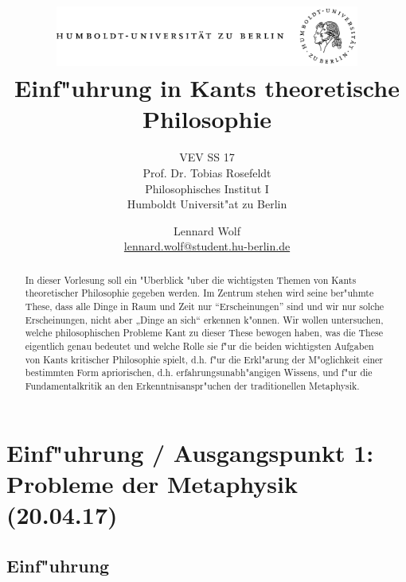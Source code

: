 \documentclass[emulatestandardclasses]{scrartcl}
\date{\vspace{-3ex}}
\begin{document}
\title{
	\includegraphics*[width=0.75\textwidth]{ErstesSem/images/hu_logo.png}\\
	\vspace{24pt}
	Einf"uhrung in Kants theoretische Philosophie}
\subtitle{VEV SS 17\\
          Prof. Dr. Tobias Rosefeldt\\
          Philosophisches Institut I \\ 
          Humboldt Universit"at zu Berlin}
\author{Lennard Wolf\\
        \small{\href{mailto:lennard.wolf@student.hu-berlin.de}{lennard.wolf@student.hu-berlin.de}}}
\maketitle
\begin{abstract}

In dieser Vorlesung soll ein "Uberblick "uber die wichtigsten Themen von Kants theoretischer Philosophie gegeben werden. Im Zentrum stehen wird seine ber"uhmte These, dass alle Dinge in Raum und Zeit nur "`Erscheinungen"' sind und wir nur solche Erscheinungen, nicht aber „Dinge an sich“ erkennen k"onnen. Wir wollen untersuchen, welche philosophischen Probleme Kant zu dieser These bewogen haben, was die These eigentlich genau bedeutet und welche Rolle sie f"ur die beiden wichtigsten Aufgaben von Kants kritischer Philosophie spielt, d.h. f"ur die Erkl"arung der M"oglichkeit einer bestimmten Form apriorischen, d.h. erfahrungsunabh"angigen Wissens, und f"ur die Fundamentalkritik an den Erkenntnisanspr"uchen der traditionellen Metaphysik.

\end{abstract}
\newpage

\tableofcontents
\listoffigures
\newpage


\section{Einf"uhrung / Ausgangspunkt 1: Probleme der Metaphysik\\(20.04.17)}

\subsection{Einf"uhrung}
\end{document}
